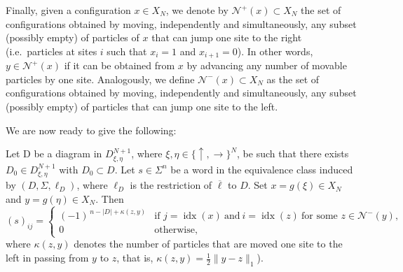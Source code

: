 \documentclass{article}
\begin{document}
Finally, given a configuration $x\in {X}_N$, we denote by $\mathcal{N}^+(x)\subset X_N$ the set of configurations obtained by moving, independently and simultaneously, any subset (possibly empty) of particles of $x$ that can jump one site to the right (i.e.\ particles at sites $i$ such that $x_i=1$ and $x_{i+1}=0$). In other words, $y\in\mathcal{N}^+(x)$ if it can be obtained from $x$ by advancing any number of movable particles by one site. Analogously, we define $\mathcal{N}^-(x)\subset X_N$ as the set of configurations obtained by moving, independently and simultaneously, any subset (possibly empty) of particles that can jump one site to the left.

We are now ready to give the following:


\begin{lemma}
Let D be a diagram in $D_{\xi,\eta}^{N+1}$, where $\xi,\eta\in\{\uparrow,\rightarrow\}^N$, be such that there exists $D_0\in D_{\xi,\eta}^{N+1}$ with $D_0\subset D$. Let $s\in\Sigma^n$ be a word in the equivalence class induced by $(D,\Sigma,\ell_D)$, where $\ell_D$ is the restriction of $\overline{\ell}$ to $D$. Set $x=g(\xi)\in X_N$ and $y=g(\eta)\in X_N$. Then
\[
(s)_{ij}=
\begin{cases}
(-1)^{\,n-|D|+\kappa(z,y)}
& \text{if } j=\operatorname{idx}(x)\ \text{and}\ i=\operatorname{idx}(z)\ \text{for some } z\in \mathcal{N}^-(y),\\[4pt]
0 & \text{otherwise},
\end{cases}
\]
where $\kappa(z,y)$ denotes the number of particles that are moved one site to the left in passing from $y$ to $z$, that is, $\kappa(z,y)=\frac12\|y-z\|_1$).
\end{lemma}
\end{document}
